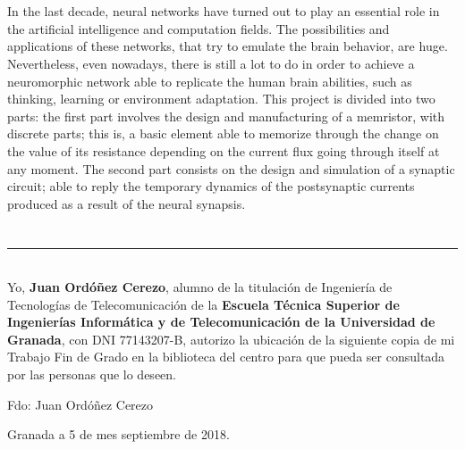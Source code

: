 \\

\vspace{0.7cm}
\\

In the last decade, neural networks have turned out to play an essential role in the artificial intelligence and computation fields. The possibilities and applications of these networks, that try to emulate the brain behavior, are huge. Nevertheless, even nowadays, there is still a lot to do in order to achieve a neuromorphic network able to replicate the human brain abilities, such as thinking, learning or environment adaptation. This project is divided into two parts: the first part involves the design and manufacturing of a memristor, with discrete parts; this is, a basic element able to memorize through the change on the value of its resistance depending on the current flux going through itself at any moment. The second part consists on the design and simulation of a synaptic circuit; able to reply the temporary dynamics of the postsynaptic currents produced as a result of the neural synapsis.

\chapter*{}
\thispagestyle{empty}

\noindent\rule[-1ex]{\textwidth}{2pt}\\[4.5ex]

Yo, \textbf{Juan Ordóñez Cerezo}, alumno de la titulación de Ingeniería de Tecnologías de Telecomunicación de la \textbf{Escuela Técnica Superior
de Ingenierías Informática y de Telecomunicación de la Universidad de Granada}, con DNI 77143207-B, autorizo la
ubicación de la siguiente copia de mi Trabajo Fin de Grado en la biblioteca del centro para que pueda ser
consultada por las personas que lo deseen.

\vspace{6cm}

\noindent Fdo: Juan Ordóñez Cerezo

\vspace{2cm}

\begin{flushright}
Granada a 5 de mes septiembre de 2018.
\end{flushright}


